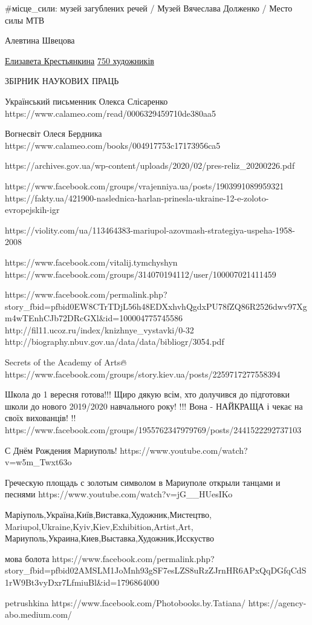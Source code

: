
#місце_сили: музей загублених речей / Музей Вячеслава Долженко / Место силы МТВ 

Алевтина Швецова

\href{https://www.facebook.com/lizakrestiankina}{Елизавета Крестьянкина}
\href{https://www.facebook.com/groups/1013559558679300}{750 художників}

ЗБІРНИК НАУКОВИХ ПРАЦЬ

Український письменник Олекса Слісаренко
https://www.calameo.com/read/0006329459710de380aa5

Вогнесвіт Олеся Бердника
https://www.calameo.com/books/004917753c17173956ca5

https://archives.gov.ua/wp-content/uploads/2020/02/pres-reliz_20200226.pdf

https://www.facebook.com/groups/vrajenniya.ua/posts/1903991089959321
https://fakty.ua/421900-naslednica-harlan-prinesla-ukraine-12-e-zoloto-evropejskih-igr

https://violity.com/ua/113464383-mariupol-azovmash-strategiya-uspeha-1958-2008

https://www.facebook.com/vitalij.tymchyshyn
https://www.facebook.com/groups/314070194112/user/100007021411459

https://www.facebook.com/permalink.php?story_fbid=pfbid0EW8CTrTDjL56h48EDXxhvhQgdxPU78fZQ86R2526dwv97Xgm4wTEnhCJb72DRcGXl&id=100004775745586
http://fil11.ucoz.ru/index/knizhnye_vystavki/0-32
http://biography.nbuv.gov.ua/data/data/bibliogr/3054.pdf

Secrets of the Academy of Arts🔥
https://www.facebook.com/groups/story.kiev.ua/posts/2259717277558394

Школа до 1 вересня готова!!!  Щиро дякую всім,  хто долучився до підготовки школи до нового 2019/2020
навчального року! !!!  Вона - НАЙКРАЩА і чекає на своїх вихованців! !!
https://www.facebook.com/groups/1955762347979769/posts/2441522292737103

С Днём Рождения Мариуполь!
https://www.youtube.com/watch?v=w5m_Twxt63o

Греческую площадь с золотым символом в Мариуполе открыли танцами и песнями
https://www.youtube.com/watch?v=jG__HUesIKo

Маріуполь,Україна,Київ,Виставка,Художник,Мистецтво,
Mariupol,Ukraine,Kyiv,Kiev,Exhibition,Artist,Art,
Мариуполь,Украина,Киев,Выставка,Художник,Исскуство

мова болота
https://www.facebook.com/permalink.php?story_fbid=pfbid02AMSLM1JoMnh93gSF7esLZS8uRzZJrnHR6APxQqDGfqCdS1rW9Bt3vyDxr7LfmiuBl&id=1796864000

petrushkina
https://www.facebook.com/Photobooks.by.Tatiana/
https://agency-abo.medium.com/%
